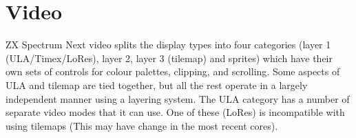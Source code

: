 \chapter{Video}

ZX Spectrum Next video splits the display types into four categories
(layer 1 (ULA/Timex/LoRes), layer 2, layer 3 (tilemap) and sprites)
which have their own sets of controls for colour palettes, clipping,
and scrolling. Some aspects of ULA and tilemap are tied together, but
all the rest operate in a largely independent manner using a layering
system. The ULA category has a number of separate video modes that it
can use. One of these (LoRes) is incompatible with using tilemaps
(This may have change in the most recent cores).






